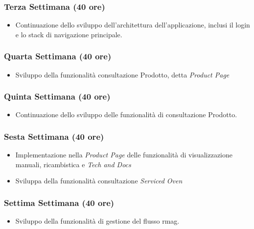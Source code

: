 \subsubsection*{Terza Settimana (40 ore)}
\begin{itemize}
    \item Continuazione dello sviluppo dell'architettura dell'applicazione, inclusi il login e lo stack di navigazione principale.
\end{itemize}

\subsubsection*{Quarta Settimana (40 ore)}
\begin{itemize}
    \item Sviluppo della funzionalità consultazione Prodotto, detta \textit{Product Page}
\end{itemize}

\subsubsection*{Quinta Settimana (40 ore)}
\begin{itemize}
    \item Continuazione dello sviluppo delle funzionalità di consultazione Prodotto.
\end{itemize}

\subsubsection*{Sesta Settimana (40 ore)}
\begin{itemize}
    \item Implementazione nella \textit{Product Page} delle funzionalità di visualizzazione manuali, ricambistica e \textit{Tech and Docs} 
    \item Sviluppa della funzionalità consultazione \textit{Serviced Oven} 
\end{itemize}

\subsubsection*{Settima Settimana (40 ore)}
\begin{itemize}
    \item Sviluppo della funzionalità di gestione del flusso \gls{rmag}\glox\gloxspacing.
\end{itemize}

